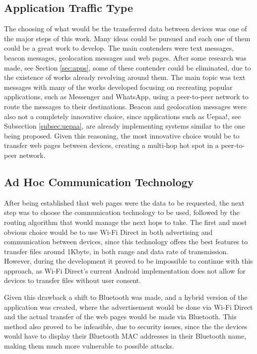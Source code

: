 \subsection{Application Traffic Type}

The choosing of what would be the transferred data between devices was one of the major steps of this work. Many ideas could be pursued and each one of them could be a great work to develop. The main contenders were text messages, beacon messages, geolocation messages and web pages. After some research was made, see Section \ref{sec:apps}, some of these contender could be eliminated, due to the existence of works already revolving around them. The main topic was text messages with many of the works developed focusing on recreating popular applications, such as Messenger and WhatsApp, using a peer-to-peer network to route the messages to their destinations. Beacon and geolocation messages were also not a completely innovative choice, since applications such as Uepaa!, see Subsection \ref{subsec:uepaa}, are already implementing systems similar to the one being proposed. Given this reasoning, the most innovative choice would be to transfer web pages between devices, creating a multi-hop hot spot in a peer-to-peer network.

\subsection{Ad Hoc Communication Technology}

After being established that web pages were the data to be requested, the next step was to choose the communication technology to be used, followed by the routing algorithm that would manage the next hops to take. The first and most obvious choice would be to use Wi-Fi Direct in both advertising and communication between devices, since this technology offers the best features to transfer files around 1Kbyte, in both range and data rate of transmission. However, during the development it proved to be impossible to continue with this approach, as Wi-Fi Direct's current Android implementation does not allow for devices to transfer files without user consent.

Given this drawback a shift to Bluetooth was made, and a hybrid version of the application was created, where the advertisement would be done via Wi-Fi Direct and the actual transfer of the web pages would be made via Bluetooth. This method also proved to be infeasible, due to security issues, since the the devices would have to display their Bluetooth MAC addresses in their Bluetooth name, making them much more vulnerable to possible attacks.

